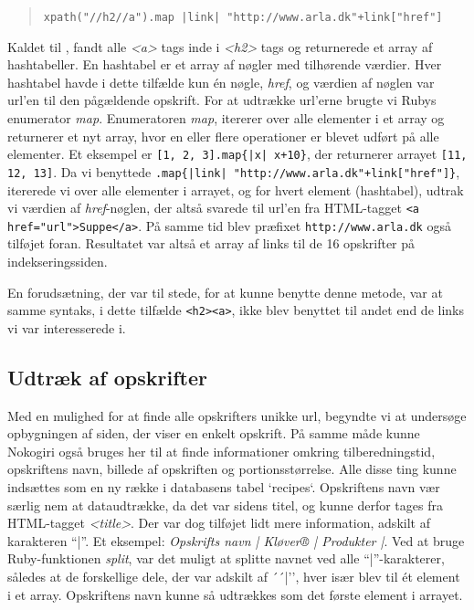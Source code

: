 \begin{quote} 
 \lstinline{xpath("//h2//a").map |link| "http://www.arla.dk"+link["href"]}
\end{quote}

Kaldet til , fandt alle \textit{<a>} tags inde i \textit{<h2>} tags og returnerede et array af hashtabeller. En hashtabel er et array af nøgler med tilhørende værdier. Hver hashtabel havde i dette tilfælde kun én nøgle, \textit{href}, og værdien af nøglen var url'en til den pågældende opskrift. For at udtrække url'erne brugte vi Rubys enumerator \textit{map}. Enumeratoren \textit{map}, itererer over alle elementer i et array og returnerer et nyt array, hvor en eller flere operationer er blevet udført på alle elementer\cite{rubydoc}. Et eksempel er \texttt{[1, 2, 3].map\{|x| x+10\}}, der returnerer arrayet \texttt{[11, 12, 13]}. Da vi benyttede \texttt{.map\{|link| "http://www.arla.dk"+link["href"]\}}, itererede vi over alle elementer i arrayet, og for hvert element (hashtabel), udtrak vi værdien af \textit{href}-nøglen, der altså svarede til url'en fra HTML-tagget \texttt{<a href="url">Suppe</a>}. På samme tid blev præfixet \texttt{http://www.arla.dk} også tilføjet foran. Resultatet var altså et array af links til de 16 opskrifter på indekseringssiden.

En forudsætning, der var til stede, for at kunne benytte denne metode, var at samme syntaks, i dette tilfælde \lstinline{<h2><a>}, ikke blev benyttet til andet end de links vi var interesserede i.


\subsection{Udtræk af opskrifter}

Med en mulighed for at finde alle opskrifters unikke url, begyndte vi at undersøge opbygningen af siden, der viser en enkelt opskrift.
På samme måde kunne Nokogiri også bruges her til at finde informationer omkring tilberedningstid, opskriftens navn, billede af opskriften og portionsstørrelse. Alle disse ting kunne indsættes som en ny række i databasens tabel `recipes`. Opskriftens navn vær særlig nem at dataudtrække, da det var sidens titel, og kunne derfor tages fra HTML-tagget \textit{<title>}. Der var dog tilføjet lidt mere information, adskilt af karakteren ``|''. Et eksempel: \textit{Opskrifts navn | Kløver® | Produkter |}. Ved at bruge Ruby-funktionen \textit{split}\cite{rubydoc}, var det muligt at splitte navnet ved alle ``|''-karakterer, således at de forskellige dele, der var adskilt af ´´|'', hver især blev til ét element i et array. Opskriftens navn kunne så udtrækkes som det første element i arrayet.

